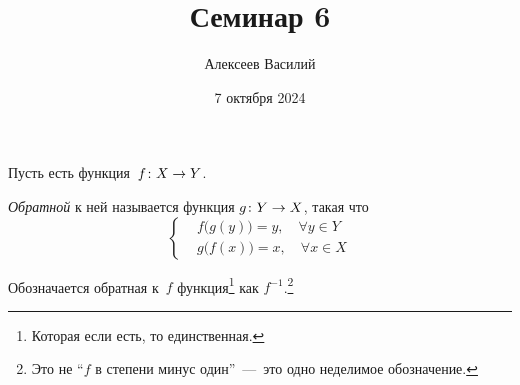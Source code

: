 \documentclass[a4paper,12pt]{article}
\author{Алексеев Василий}
\title{Семинар 6}
\date{7 октября 2024}
\begin{document}
  
%
  
  
  
  
  


  

  
  

  
  \begin{definition}
    Пусть есть функция~$f\colon X \hm\to Y$.
    
    \emph{Обратной} к ней называется функция $g\colon Y \hm\to X$, такая что
    \[
      \left\{\begin{aligned}
        &f\bigl(g(y)\bigr) = y,\quad \forall y \in Y\\
        &g\bigl(f(x)\bigr) = x,\quad \forall x \in X
      \end{aligned}\right.
    \]
    
    Обозначается обратная к~$f$ функция\footnote{
      Которая если есть, то единственная.
    } как $f^{-1}$.\footnote{
      Это не ``$f$ в степени минус один''~---~это одно неделимое обозначение.
    }
  \end{definition}
  
\end{document}
